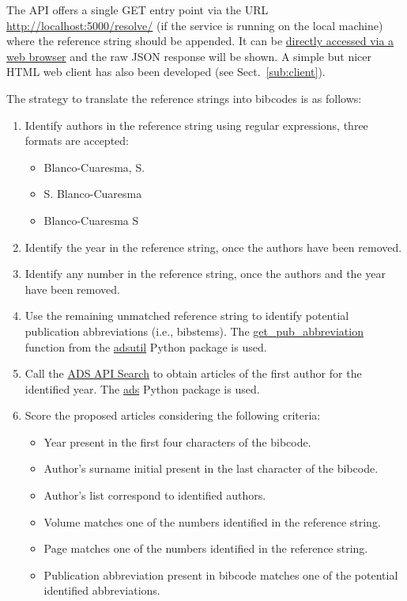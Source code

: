 \documentclass[a4paper,10pt,twoside]{article}
\begin{document}
The API offers a single GET entry point via the URL \href{http://localhost:5000/resolve/}{http://localhost:5000/resolve/} (if the service is running on the local machine) where the reference string should be appended. It can be \href{http://localhost:5000/resolve/Abt,\%20H.\%201990,\%20ApJ,\%20357,\%201}{directly accessed via a web browser} and the raw JSON response will be shown. A simple but nicer HTML web client has also been developed (see Sect.~\ref{sub:client}).

The strategy to translate the reference strings into bibcodes is as follows:

\begin{enumerate}
	\item Identify authors in the reference string using regular expressions, three formats are accepted:
		\begin{itemize}
			\item Blanco-Cuaresma, S.
			\item S. Blanco-Cuaresma
			\item Blanco-Cuaresma S
		\end{itemize}
	\item Identify the year in the reference string, once the authors have been removed.
	\item Identify any number in the reference string, once the authors and the year have been removed.
	\item Use the remaining unmatched reference string to identify potential publication abbreviations (i.e., bibstems). The \href{https://github.com/adsabs/adsutils/#utility-to-get-ads-journal-abbreviation-from-publication-name}{get\_pub\_abbreviation} function from the \href{https://github.com/adsabs/adsutils/}{adsutil} Python package is used.
	\item Call the \href{https://github.com/adsabs/adsabs-dev-api/blob/master/search.md}{ADS API Search} to obtain articles of the first author for the identified year. The \href{https://github.com/andycasey/ads}{ads} Python package is used.
	\item Score the proposed articles considering the following criteria:
		\begin{itemize}
			\item Year present in the first four characters of the bibcode.
			\item Author's surname initial present in the last character of the bibcode.
			\item Author's list correspond to identified authors.
			\item Volume matches one of the numbers identified in the reference string.
			\item Page matches one of the numbers identified in the reference string.
			\item Publication abbreviation present in bibcode matches one of the potential identified abbreviations.
		\end{itemize}
\end{enumerate}
\end{document}
